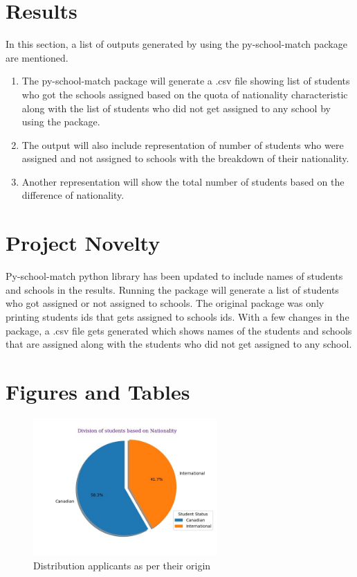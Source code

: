 \documentclass[twocolumn]{bmcart}
\begin{document}
	
	\section*{Results}
	\vspace{\baselineskip}
	In this section, a list of outputs generated by using the py-school-match package are mentioned.\vspace{\baselineskip}
	
	\begin{enumerate}
		\vspace{-0.4cm}\item The py-school-match package will generate a .csv file showing list of students who got the schools assigned based on the quota of nationality characteristic along with the list of students who did not get assigned to any school by using the package. \vspace{\baselineskip}
		\vspace{-0.4cm}\item The output will also include representation of number of students who were assigned and not assigned to schools with the breakdown of their nationality. \vspace{\baselineskip}
		\vspace{-0.4cm}\item Another representation will show the total number of students based on the difference of nationality.
		\vspace{\baselineskip} 
	\end{enumerate}
	
	\section*{Project Novelty}
	
	Py-school-match python library has been updated to include names of students and schools in the results. Running the package will generate a list of students who got assigned or not assigned to schools. The original package was only printing students ids that gets assigned to schools ids. With a few changes in the package, a .csv file gets generated which shows names of the students and schools that are assigned along with the students who did not get assigned to any school.
	
	\section*{Figures and Tables}
	\begin{figure}[h!]
		\centering
		\includegraphics[width=7cm]{pie.jpg}
		\caption{Distribution applicants as per their origin}
		\label{fig:Distribution}
	\end{figure}
	
\end{document}
